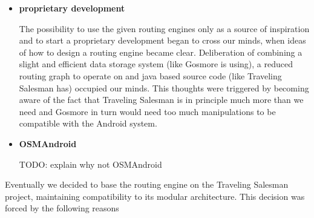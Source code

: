 \begin{itemize}
	\item \textbf{proprietary development}

		The possibility to use the given routing engines only as a source of inspiration and to start a proprietary development began to cross our minds, when ideas of how to design a routing engine became clear. Deliberation of combining a slight and efficient data storage system (like Gosmore is using), a reduced routing graph to operate on and java based source code (like Traveling Salesman has) occupied our minds. This thoughts were triggered by becoming aware of the fact that Traveling Salesman is in principle much more than we need and Gosmore in turn would need too much manipulations to be compatible with the Android system.

	\item \textbf{OSMAndroid}

		TODO: explain why not OSMAndroid	

\end{itemize}

Eventually we decided to base the routing engine on the Traveling Salesman project, maintaining compatibility to its modular architecture. This decision was forced by the following reasons

